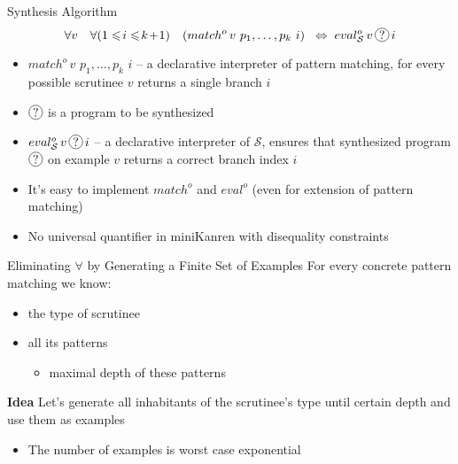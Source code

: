 \documentclass[aspectratio=169
  , xcolor={svgnames}
  , hyperref={ colorlinks,citecolor=Blue
             , linkcolor=DarkRed,urlcolor=DarkBlue}
  , russian
  ]{beamer}
\newcommand*\circled[1]{\tikz[baseline=(char.base)]{
    \node[shape=circle,draw,inner sep=1pt] (char) {#1};}}
\begin{document}
\begin{frame}{Synthesis Algorithm}
\[
\forall v \quad \forall  (1\leqslant\!i\leqslant \!k\!+\!1) \quad
(match^o\,v\,\,p_1,\dots,p_k\,\,i) \;\; \Leftrightarrow \;
eval^o_{\mathcal S}\,v\,\circled{?}\,i
\]

\begin{itemize}
\item $match^o\,v\,\,p_1,\dots,p_k\,\,i$ -- a declarative interpreter of pattern matching, for every  possible scrutinee $v$ returns a single branch $i$ 
\item $\circled{?}$ is a program to be synthesized
\item $eval^o_{\mathcal S}\,v\,\circled{?}\,i$ -- a declarative interpreter of $\mathcal S$, ensures that synthesized program $\circled{?}$ on example $v$ returns a correct branch index $i$
\end{itemize}
\vspace{1cm}
\begin{itemize}
\item[\faGood] It's easy to implement $match^o$ and  $eval^o$ (even for extension of pattern matching)
\item[\faBad]  No universal quantifier in miniKanren with disequality constraints
\end{itemize}

\end{frame}


\begin{frame}{Eliminating $\forall$ by Generating a Finite Set of Examples}
For every concrete pattern matching we know:
\begin{itemize}
\item the type of scrutinee
\item all its patterns 
\begin{itemize}
\item maximal depth of these patterns
\end{itemize}
\end{itemize}

\begin{alertblock}{\textbf{Idea}}
Let's generate all inhabitants of the scrutinee's type until certain depth and use them as examples
\end{alertblock}
\vspace{1cm}

\begin{itemize}
\item[\faBad] The number of examples is  worst case exponential
\end{itemize}
\end{frame}
\end{document}
